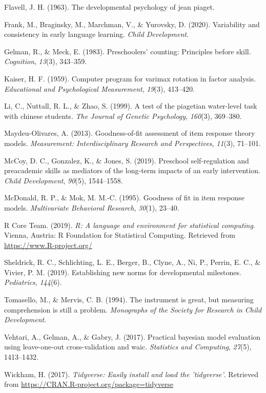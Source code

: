 \documentclass[10pt, letterpaper]{article}
\begin{document}
\leavevmode\hypertarget{ref-flavell1963developmental}{}%
Flavell, J. H. (1963). The developmental psychology of jean piaget.

\leavevmode\hypertarget{ref-wordbank}{}%
Frank, M., Braginsky, M., Marchman, V., \& Yurovsky, D. (2020).
Variability and consistency in early language learning. \emph{Child
Development}.

\leavevmode\hypertarget{ref-gelman1983preschoolers}{}%
Gelman, R., \& Meck, E. (1983). Preschoolers' counting: Principles
before skill. \emph{Cognition}, \emph{13}(3), 343--359.

\leavevmode\hypertarget{ref-kaiser1959computer}{}%
Kaiser, H. F. (1959). Computer program for varimax rotation in factor
analysis. \emph{Educational and Psychological Measurement},
\emph{19}(3), 413--420.

\leavevmode\hypertarget{ref-li1999test}{}%
Li, C., Nuttall, R. L., \& Zhao, S. (1999). A test of the piagetian
water-level task with chinese students. \emph{The Journal of Genetic
Psychology}, \emph{160}(3), 369--380.

\leavevmode\hypertarget{ref-maydeu2013goodness}{}%
Maydeu-Olivares, A. (2013). Goodness-of-fit assessment of item response
theory models. \emph{Measurement: Interdisciplinary Research and
Perspectives}, \emph{11}(3), 71--101.

\leavevmode\hypertarget{ref-mccoy2019preschool}{}%
McCoy, D. C., Gonzalez, K., \& Jones, S. (2019). Preschool
self-regulation and preacademic skills as mediators of the long-term
impacts of an early intervention. \emph{Child Development},
\emph{90}(5), 1544--1558.

\leavevmode\hypertarget{ref-mcdonald1995goodness}{}%
McDonald, R. P., \& Mok, M. M.-C. (1995). Goodness of fit in item
response models. \emph{Multivariate Behavioral Research}, \emph{30}(1),
23--40.

\leavevmode\hypertarget{ref-rcore}{}%
R Core Team. (2019). \emph{R: A language and environment for statistical
computing}. Vienna, Austria: R Foundation for Statistical Computing.
Retrieved from \url{https://www.R-project.org/}

\leavevmode\hypertarget{ref-sheldrick2019establishing}{}%
Sheldrick, R. C., Schlichting, L. E., Berger, B., Clyne, A., Ni, P.,
Perrin, E. C., \& Vivier, P. M. (2019). Establishing new norms for
developmental milestones. \emph{Pediatrics}, \emph{144}(6).

\leavevmode\hypertarget{ref-tomasello1994instrument}{}%
Tomasello, M., \& Mervis, C. B. (1994). The instrument is great, but
measuring comprehension is still a problem. \emph{Monographs of the
Society for Research in Child Development}.

\leavevmode\hypertarget{ref-vehtari2017practical}{}%
Vehtari, A., Gelman, A., \& Gabry, J. (2017). Practical bayesian model
evaluation using leave-one-out cross-validation and waic.
\emph{Statistics and Computing}, \emph{27}(5), 1413--1432.

\leavevmode\hypertarget{ref-tidy}{}%
Wickham, H. (2017). \emph{Tidyverse: Easily install and load the
'tidyverse'}. Retrieved from
\url{https://CRAN.R-project.org/package=tidyverse}


\end{document}
